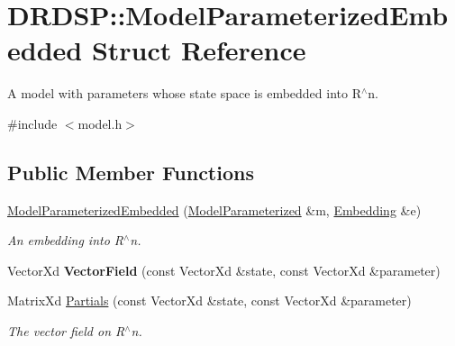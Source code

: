 \hypertarget{struct_d_r_d_s_p_1_1_model_parameterized_embedded}{\section{D\-R\-D\-S\-P\-:\-:Model\-Parameterized\-Embedded Struct Reference}
\label{struct_d_r_d_s_p_1_1_model_parameterized_embedded}
}


A model with parameters whose state space is embedded into R$^\wedge$n.  




{\ttfamily \#include $<$model.\-h$>$}

\subsection*{Public Member Functions}
\begin{DoxyCompactItemize}
\item 
\hypertarget{struct_d_r_d_s_p_1_1_model_parameterized_embedded_a3a8a9503f4175ab7c015912661a93fad}{\hyperlink{struct_d_r_d_s_p_1_1_model_parameterized_embedded_a3a8a9503f4175ab7c015912661a93fad}{Model\-Parameterized\-Embedded} (\hyperlink{struct_d_r_d_s_p_1_1_model_parameterized}{Model\-Parameterized} \&m, \hyperlink{struct_d_r_d_s_p_1_1_embedding}{Embedding} \&e)}\label{struct_d_r_d_s_p_1_1_model_parameterized_embedded_a3a8a9503f4175ab7c015912661a93fad}

\begin{DoxyCompactList}\small\item\em An embedding into R$^\wedge$n. \end{DoxyCompactList}\item 
\hypertarget{struct_d_r_d_s_p_1_1_model_parameterized_embedded_a1b2616cdd5889d38bfcf68116aaa9355}{Vector\-Xd {\bfseries Vector\-Field} (const Vector\-Xd \&state, const Vector\-Xd \&parameter)}\label{struct_d_r_d_s_p_1_1_model_parameterized_embedded_a1b2616cdd5889d38bfcf68116aaa9355}

\item 
\hypertarget{struct_d_r_d_s_p_1_1_model_parameterized_embedded_ae7ba4d682d23057bdb6d09b1b0005f33}{Matrix\-Xd \hyperlink{struct_d_r_d_s_p_1_1_model_parameterized_embedded_ae7ba4d682d23057bdb6d09b1b0005f33}{Partials} (const Vector\-Xd \&state, const Vector\-Xd \&parameter)}\label{struct_d_r_d_s_p_1_1_model_parameterized_embedded_ae7ba4d682d23057bdb6d09b1b0005f33}

\begin{DoxyCompactList}\small\item\em The vector field on R$^\wedge$n. \end{DoxyCompactList}\end{DoxyCompactItemize}
